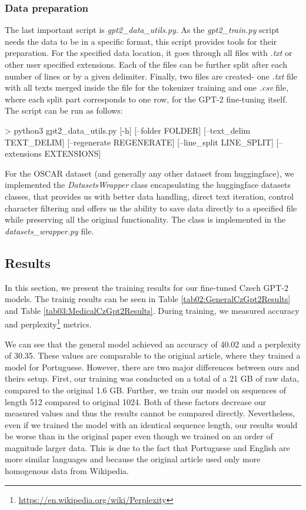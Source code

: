 \subsubsection*{Data preparation}
The last important script is \textit{gpt2\_data\_utils.py}. As the \textit{gpt2\_train.py} script needs the data to be in a specific format, this script provides tools for their preparation. For the specified data location, it goes through all files with \textit{.txt} or other user specified extensions. Each of the files can be further split after each number of lines or by a given delimiter. Finally, two files are created- one \textit{.txt} file with all texts merged inside the file for the tokenizer training and one \textit{.csv} file, where each split part corresponds to one row, for the GPT-2 fine-tuning itself. The script can be run as follows:\\
\begin{code}
> python3 gpt2_data_utils.py [-h] [--folder FOLDER] 
                             [--text_delim TEXT_DELIM] 
                             [--regenerate REGENERATE] 
                             [--line_split LINE_SPLIT] 
                             [--extensions EXTENSIONS]
\end{code}

For the OSCAR dataset (and generally any other dataset from huggingface), we implemented the \textit{DatasetsWrapper} class encapsulating the huggingface datasets classes, that provides us with better data handling, direct text iteration, control character filtering and offers us the ability to save data directly to a specified file while preserving all the original functionality. The class is implemented in the \textit{datasets\_wrapper.py} file.

\subsection{Results}
In this section, we present the training results for our fine-tuned Czech GPT-2 models. The trainig results can be seen in Table \ref{tab02:GeneralCzGpt2Results} and Table \ref{tab03:MedicalCzGpt2Results}. During training, we measured accuracy and perplexity\footnote[7]{\url{https://en.wikipedia.org/wiki/Perplexity}} metrics.

We can see that the general model achieved an accuracy of 40.02 and a perplexity of 30.35. These values are comparable to the original article, where they trained a model for Portuguese. However, there are two major differences between ours and theirs setup. First, our training was conducted on a total of a 21 GB of raw data, compared to the original 1.6 GB. Further, we train our model on sequences of length 512 compared to original 1024. Both of these factors decrease our measured values and thus the results cannot be compared directly. Nevertheless, even if we trained the model with an identical sequence length, our results would be worse than in the original paper even though we trained on an order of magnitude larger data. This is due to the fact that Portuguese and English are more similar languages and because the original article used only more homogenous data from Wikipedia.\\

